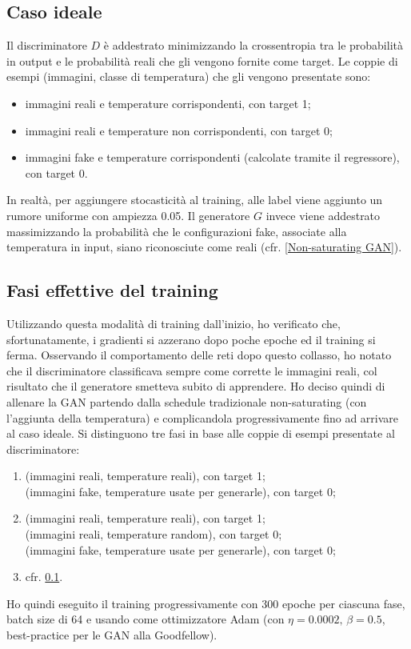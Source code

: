\documentclass[Lau, noexaminfo, oneside]{sapthesis} %
\begin{document}
\subsection{Caso ideale}
\label{Caso ideale}
Il discriminatore $D$ è addestrato minimizzando la crossentropia tra le probabilità in output e le probabilità reali che gli vengono fornite come target. Le coppie di esempi (immagini, classe di temperatura) che gli vengono presentate sono:
\begin{itemize}
\item immagini reali e temperature corrispondenti, con target 1;
\item immagini reali e temperature non corrispondenti, con target 0;
\item immagini fake e temperature corrispondenti (calcolate tramite il regressore), con target 0.
\end{itemize}
In realtà, per aggiungere stocasticità al training, alle label viene aggiunto un rumore uniforme con ampiezza 0.05.
Il generatore $G$ invece viene addestrato massimizzando la probabilità che le configurazioni fake, associate alla temperatura in input, siano riconosciute come reali (cfr. \ref{Non-saturating GAN}).
\subsection{Fasi effettive del training}
Utilizzando questa modalità di training dall'inizio, ho verificato che, sfortunatamente, i gradienti si azzerano dopo poche epoche ed il training si ferma. Osservando il comportamento delle reti dopo questo collasso, ho notato che il discriminatore classificava sempre come corrette le immagini reali, col risultato che il generatore smetteva subito di apprendere. Ho deciso quindi di allenare la GAN partendo dalla schedule tradizionale non-saturating (con l'aggiunta della temperatura) e complicandola progressivamente fino ad arrivare al caso ideale.
Si distinguono tre fasi in base alle coppie di esempi presentate al discriminatore:
\begin{enumerate}[label=\Alph*:]
\item (immagini reali, temperature reali), con target 1;\\(immagini fake, temperature usate per generarle), con target 0;
\item (immagini reali, temperature reali), con target 1;\\(immagini reali, temperature random), con target 0;\\(immagini fake, temperature usate per generarle), con target 0;
\item cfr. \ref{Caso ideale}.
\end{enumerate}
Ho quindi eseguito il training progressivamente con 300 epoche per ciascuna fase, batch size di 64 e usando come ottimizzatore Adam \cite{adam} (con $\eta=0.0002,\,\beta=0.5$, best-practice per le GAN alla Goodfellow).
\end{document}
